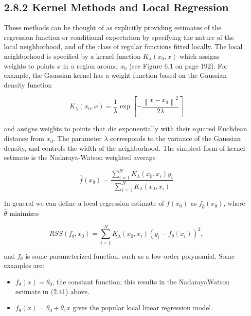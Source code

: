\documentclass[10pt]{article}
\begin{document}
\subsection*{2.8.2 Kernel Methods and Local Regression}
These methods can be thought of as explicitly providing estimates of the regression function or conditional expectation by specifying the nature of the local neighborhood, and of the class of regular functions fitted locally. The local neighborhood is specified by a kernel function $K_{\lambda}\left(x_{0}, x\right)$ which assigns\\
weights to points $x$ in a region around $x_{0}$ (see Figure 6.1 on page 192). For example, the Gaussian kernel has a weight function based on the Gaussian density function


\begin{equation*}
K_{\lambda}\left(x_{0}, x\right)=\frac{1}{\lambda} \exp \left[-\frac{\left\|x-x_{0}\right\|^{2}}{2 \lambda}\right] \tag{2.40}
\end{equation*}


and assigns weights to points that die exponentially with their squared Euclidean distance from $x_{0}$. The parameter $\lambda$ corresponds to the variance of the Gaussian density, and controls the width of the neighborhood. The simplest form of kernel estimate is the Nadaraya-Watson weighted average


\begin{equation*}
\hat{f}\left(x_{0}\right)=\frac{\sum_{i=1}^{N} K_{\lambda}\left(x_{0}, x_{i}\right) y_{i}}{\sum_{i=1}^{N} K_{\lambda}\left(x_{0}, x_{i}\right)} \tag{2.41}
\end{equation*}


In general we can define a local regression estimate of $f\left(x_{0}\right)$ as $f_{\hat{\theta}}\left(x_{0}\right)$, where $\hat{\theta}$ minimizes


\begin{equation*}
R S S\left(f_{\theta}, x_{0}\right)=\sum_{i=1}^{N} K_{\lambda}\left(x_{0}, x_{i}\right)\left(y_{i}-f_{\theta}\left(x_{i}\right)\right)^{2}, \tag{2.42}
\end{equation*}


and $f_{\theta}$ is some parameterized function, such as a low-order polynomial. Some examples are:

\begin{itemize}
  \item $f_{\theta}(x)=\theta_{0}$, the constant function; this results in the NadarayaWatson estimate in (2.41) above.
  \item $f_{\theta}(x)=\theta_{0}+\theta_{1} x$ gives the popular local linear regression model.
\end{itemize}
\end{document}
